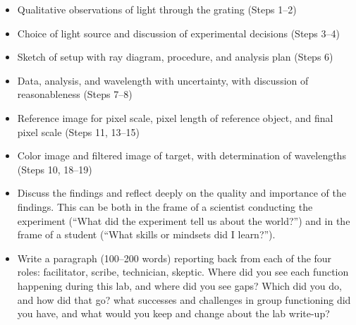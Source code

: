 \begin{itemize}
	\item Qualitative observations of light through the grating (Steps 1--2)
	
	\item Choice of light source and discussion of experimental decisions (Steps 3--4)
	
	\item Sketch of setup with ray diagram, procedure, and analysis plan (Steps 6)
	
	\item Data, analysis, and wavelength with uncertainty, with discussion of reasonableness (Steps 7--8)
	
	\item Reference image for pixel scale, pixel length of reference object, and final pixel scale (Steps 11, 13--15)
	
	\item Color image and filtered image of target, with determination of wavelengths (Steps 10, 18--19)
	
	\item Discuss the findings and reflect deeply on the quality and importance of the findings. This can be both in the frame of a scientist conducting the experiment (“What did the experiment tell us about the world?”) and in the frame of a student (“What skills or mindsets did I learn?”).

	\item Write a paragraph (100--200 words) reporting back from each of the four roles: facilitator, scribe, technician, skeptic. Where did you see each function happening during this lab, and where did you see gaps? Which did you do, and how did that go? what successes and	challenges in group functioning did you have, and what would you keep and change about the lab write-up?

\end{itemize}